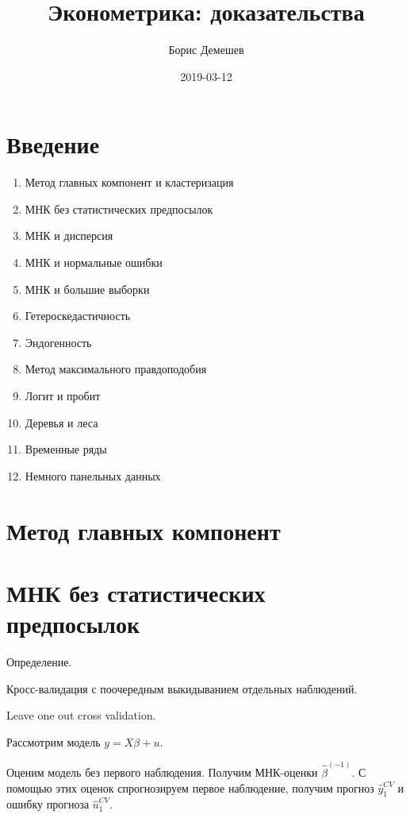 \documentclass[11pt,russian,]{book}
\title{Эконометрика: доказательства}
\author{Борис Демешев}
\date{2019-03-12}
\begin{document}
\maketitle

{
\setcounter{tocdepth}{1}
\tableofcontents
}
\hypertarget{intro}{%
\chapter{Введение}\label{intro}}

\begin{enumerate}
\def\labelenumi{\arabic{enumi}.}
\item
  Метод главных компонент и кластеризация
\item
  МНК без статистических предпосылок
\item
  МНК и дисперсия
\item
  МНК и нормальные ошибки
\item
  МНК и большие выборки
\item
  Гетероскедастичность
\item
  Эндогенность
\item
  Метод максимального правдоподобия
\item
  Логит и пробит
\item
  Деревья и леса
\item
  Временные ряды
\item
  Немного панельных данных
\end{enumerate}

\hypertarget{pca}{%
\chapter{Метод главных компонент}\label{pca}}

\hypertarget{ols_wo_stats}{%
\chapter{МНК без статистических предпосылок}\label{ols_wo_stats}}

Определение.

Кросс-валидация с поочередным выкидыванием отдельных наблюдений.

Leave one out cross validation.

Рассмотрим модель \(y=X\beta + u\).

Оценим модель без первого наблюдения. Получим МНК-оценки \(\hat\beta^{(-1)}\).
С помощью этих оценок спрогнозируем первое наблюдение, получим прогноз \(\hat y_1^{CV}\) и ошибку прогноза \(\hat u_1^{CV}\).
\end{document}
